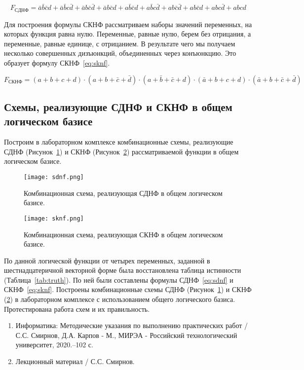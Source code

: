 \documentclass[a4paper]{article}
\begin{document}
    \begin{equation}
        \label{eq:sdnf}
        F_{СДНФ}=\bar a \bar b \bar c d + \bar a \bar b c \bar d + \bar a b \bar c \bar d + \bar a b \bar c d + a \bar b \bar c d + a \bar b c \bar d + ab \bar c \bar d + ab \bar c d + abc \bar d + abcd
    \end{equation}

    Для построения формулы СКНФ рассматриваем наборы значений переменных, на которых функция равна нулю.
    Переменные, равные нулю, берем без отрицания, а переменные, равные единице, с отрицанием.
    В результате чего мы получаем несколько совершенных дизъюнкций, объединенных через конъюнкцию.
    Это образует формулу СКНФ~\eqref{eq:sknf}.


    \begin{equation}
        \label{eq:sknf}
        F_{СКНФ}=(a + b + c + d)\cdot(a + b + \bar c + \bar d)\cdot(a + \bar b + \bar c + d)\cdot(\bar a + b + c + d)\cdot(\bar a + b + \bar c + \bar d)
    \end{equation}

    \subsection{Схемы, реализующие СДНФ и СКНФ в общем логическом базисе}\label{subsec:schemas}
    Построим в лабораторном комплексе комбинационные схемы, реализующие СДНФ (Рисунок~\ref{fig:sdnf}) и СКНФ (Рисунок~\ref{fig:sknf}) рассматриваемой функции в общем логическом базисе.

    \begin{figure}[h]

        \centering
        \texttt{[image: sdnf.png]}

        \caption{\centering Комбинационная схема, реализующая СДНФ в общем логическом базисе.}
        \label{fig:sdnf}
    \end{figure}

    \begin{figure}[h]
        \centering
        \texttt{[image: sknf.png]}

        \caption{\centering Комбинационная схема, реализующая СКНФ в общем логическом базисе.}
        \label{fig:sknf}
    \end{figure}


    \conclusion
    По данной логической функции от четырех переменных, заданной в шестнадцатеричной векторной форме
    была восстановлена таблица истинности (Таблица~\ref{tab:truth}).
    По ней были составлены формулы СДНФ~\eqref{eq:sdnf} и СКНФ~\eqref{eq:sknf}.
    Построены комбинационные схемы СДНФ (Рисунок~\ref{fig:sdnf}) и СКНФ (\ref{fig:sknf})
    в лабораторном комплексе с использованием общего логического базиса.
    Протестирована работа схем и их правильность.


    \sources
    \begin{enumerate}
        \item Информатика: Методические указания по выполнению практических
        работ / С.С. Смирнов, Д.А. Карпов - М., МИРЭА - Российский технологический университет, 2020.–102 с.
        \item Лекционный материал / С.С. Смирнов.
    \end{enumerate}
\end{document}
